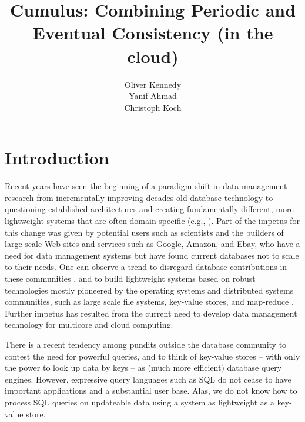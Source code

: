 \documentclass{vldb}
\title{Cumulus: Combining Periodic and Eventual Consistency (in the cloud)}
\author{
\alignauthor
Oliver Kennedy\\
  \affaddr{Cornell University}
  \affaddr{okennedy@cs.cornell.edu}
\alignauthor
Yanif Ahmad\\
  \affaddr{Cornell University}
  \affaddr{yanif@cs.cornell.edu}
\alignauthor
Christoph Koch\\
  \affaddr{Cornell University}
  \affaddr{ckoch@cs.cornell.edu}
}
\date{}
\begin{document}
\maketitle

\begin{abstract}

\end{abstract}

\section{Introduction}

Recent years have seen the beginning of a paradigm shift in data management
research from incrementally improving decades-old database technology
to questioning established architectures 
and creating fundamentally different, more lightweight systems
that are often domain-specific
(e.g.,
\cite{DBLP:conf/vldb/StonebrakerMAHHH07,DBLP:journals/pvldb/KallmanKNPRZJMSZHA08}).
Part of the impetus for this change was given by 
potential users such as scientists and the builders of
large-scale Web sites and services such as Google, Amazon, and Ebay,
who have a need for data management systems but have found current databases
not to scale to their needs.
One can observe a trend to disregard database contributions
in these communities \cite{dbcolumn, DBLP:conf/sigmod/PavloPRADMS09}, and to build lightweight systems based on
robust technologies mostly pioneered by the operating systems and distributed
systems communities, such as large scale file systems, key-value stores, and
map-reduce
\cite{DBLP:journals/cacm/DeanG08, DBLP:journals/tocs/ChangDGHWBCFG08}.
Further impetus has resulted from the current need to develop data management
technology for multicore and cloud computing.
%

There is a recent tendency
among pundits
outside the database community to
contest the need for powerful queries, and to
think of key-value stores -- with only the power to look up data by
keys -- as (much more efficient) database query engines.
%
%
However, expressive query languages such as SQL do not cease to have
important applications and a substantial user base.
Alas, we do not know how to process SQL queries on updateable data
using a system as lightweight as a key-value store.
\end{document}
